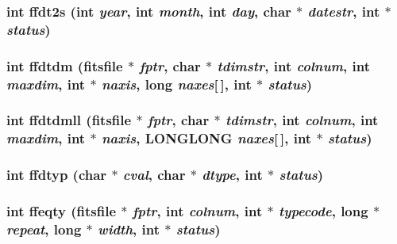 \subsubsection{\setlength{\rightskip}{0pt plus 5cm}int ffdt2s (int {\em year}, int {\em month}, int {\em day}, char $\ast$ {\em datestr}, int $\ast$ {\em status})}\label{src_2fitsio_8h_5d40e5b1da91bf71da1d25d207af045b}


\subsubsection{\setlength{\rightskip}{0pt plus 5cm}int ffdtdm (\bf{fitsfile} $\ast$ {\em fptr}, char $\ast$ {\em tdimstr}, int {\em colnum}, int {\em maxdim}, int $\ast$ {\em naxis}, long {\em naxes}[$\,$], int $\ast$ {\em status})}\label{src_2fitsio_8h_cdc35cf0e93c93afd457df39fba48f2f}


\subsubsection{\setlength{\rightskip}{0pt plus 5cm}int ffdtdmll (\bf{fitsfile} $\ast$ {\em fptr}, char $\ast$ {\em tdimstr}, int {\em colnum}, int {\em maxdim}, int $\ast$ {\em naxis}, \bf{LONGLONG} {\em naxes}[$\,$], int $\ast$ {\em status})}\label{src_2fitsio_8h_9ecfa9b8dd8e556e11f7f0ce7bae099f}


\subsubsection{\setlength{\rightskip}{0pt plus 5cm}int ffdtyp (char $\ast$ {\em cval}, char $\ast$ {\em dtype}, int $\ast$ {\em status})}\label{src_2fitsio_8h_7ef694778b02cbfa2870cdb64aa31876}


\subsubsection{\setlength{\rightskip}{0pt plus 5cm}int ffeqty (\bf{fitsfile} $\ast$ {\em fptr}, int {\em colnum}, int $\ast$ {\em typecode}, long $\ast$ {\em repeat}, long $\ast$ {\em width}, int $\ast$ {\em status})}\label{src_2fitsio_8h_36f0c3dabebb79814224d94a5d909413}


